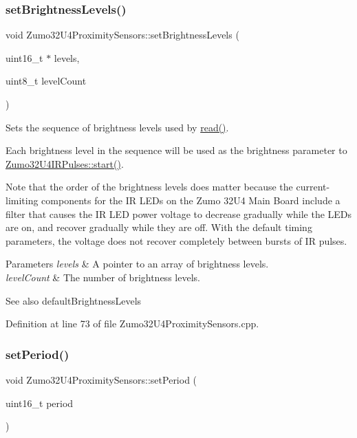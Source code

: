 \subsubsection{\texorpdfstring{set\+Brightness\+Levels()}{setBrightnessLevels()}}
{\footnotesize\ttfamily void Zumo32\+U4\+Proximity\+Sensors\+::set\+Brightness\+Levels (\begin{DoxyParamCaption}\item[{uint16\+\_\+t $\ast$}]{levels,  }\item[{uint8\+\_\+t}]{level\+Count }\end{DoxyParamCaption})}



Sets the sequence of brightness levels used by \hyperlink{class_zumo32_u4_proximity_sensors_a071d935e10e2a16a3ae2559d16a12683}{read()}. 

Each brightness level in the sequence will be used as the {\ttfamily brightness} parameter to \hyperlink{class_zumo32_u4_i_r_pulses_abef1e5f17a173505c6acc0f8c0d917d9}{Zumo32\+U4\+I\+R\+Pulses\+::start()}.

Note that the order of the brightness levels does matter because the current-\/limiting components for the IR L\+E\+Ds on the Zumo 32\+U4 Main Board include a filter that causes the IR L\+ED power voltage to decrease gradually while the L\+E\+Ds are on, and recover gradually while they are off. With the default timing parameters, the voltage does not recover completely between bursts of IR pulses.


\begin{DoxyParams}{Parameters}
{\em levels} & A pointer to an array of brightness levels. \\
\hline
{\em level\+Count} & The number of brightness levels.\\
\hline
\end{DoxyParams}
\begin{DoxySeeAlso}{See also}
default\+Brightness\+Levels 
\end{DoxySeeAlso}


Definition at line 73 of file Zumo32\+U4\+Proximity\+Sensors.\+cpp.

\mbox{\label{class_zumo32_u4_proximity_sensors_ab288aeae9bcc5933cede8941b709b4fc}} 
\subsubsection{\texorpdfstring{set\+Period()}{setPeriod()}}
{\footnotesize\ttfamily void Zumo32\+U4\+Proximity\+Sensors\+::set\+Period (\begin{DoxyParamCaption}\item[{uint16\+\_\+t}]{period }\end{DoxyParamCaption})\hspace{0.3cm}{\ttfamily [inline]}}



